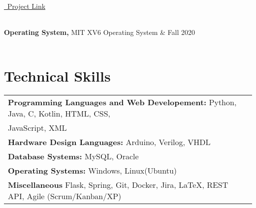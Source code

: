 \documentclass[a4paper,12pt]{article}
\begin{document}
\begin{ltxtable}{\textwidth}{}
{\begin{itemize}
    \hfill \href{https://github.com/pouyanhessabi/NLP-Comment-Filtering}{\raisebox{-0.05\height}\faGithub\ Project Link}
    \end{itemize}
    } \\
\textbf{Operating System,} MIT XV6 Operating System & \hfill Fall 2020 \\
\multicolumn{2}{@{}p{\textwidth}@{}}{
    \begin{itemize}
    \item Implemented scheduling and some system calls for XV6 OS using the C language.
    \hfill \href{https://github.com/pouyanhessabi/XV6-OS}{\raisebox{-0.02\height}\faGithub\ Project Link}
    \end{itemize}
    } \\ 
\end{ltxtable}

\section{Technical Skills}
\begin{tabularx}{\linewidth}{ @{}l r@{} }
   
    
    \textbf{Programming Languages and Web Developement:} Python, Java, C, Kotlin, HTML, CSS, \\ JavaScript, XML \\
   \textbf{Hardware Design Languages:} Arduino, Verilog, VHDL  \\
    \textbf{Database Systems:} MySQL, Oracle \\
    \textbf{Operating Systems:} Windows, Linux(Ubuntu) \\
    \textbf{Miscellaneous} Flask, Spring, Git, Docker, Jira, \LaTeX, REST API, Agile (Scrum/Kanban/XP)
\end{tabularx}
\end{document}
